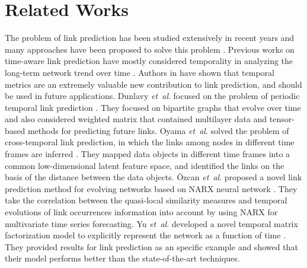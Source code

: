 \section{Related Works}\label{sec:related}
\newcommand{\etal}{\textit{et~al}.}

The problem of link prediction has been studied extensively in recent years and many approaches have been proposed to solve this problem \cite{wang2015link,wang2014review}.
Previous works on time-aware link prediction have mostly considered temporality in analyzing the long-term network trend over time \cite{dhote2013survey}. Authors in \cite{potgieter2009temporality} have shown that temporal metrics are an extremely valuable new contribution to link prediction, and should be used in future applications. 
Dunlavy \etal{} focused on the problem of periodic temporal link prediction \cite{dunlavy2011temporal}. They focused on bipartite graphs that evolve over time and also considered weighted matrix that contained multilayer data and tensor-based methods for predicting future links.
Oyama \etal{} solved the problem of cross-temporal link prediction, in which the links among nodes in different time frames are inferred \cite{oyama2011cross}. They mapped data objects in different time frames into a common low-dimensional latent feature space, and identified the links on the basis of the distance between the data objects.
{\"O}zcan \etal{} proposed a novel link prediction method for evolving networks based on NARX neural network \cite{ozcan2016temporal}. They take the correlation between the quasi-local similarity measures and temporal evolutions of link occurrences information into account by using NARX for multivariate time series forecasting.
Yu \etal{} developed a novel temporal matrix factorization model to explicitly represent the network as a function of time \cite{yu2017temporally}. They provided results for link prediction as an specific example and showed that their model performs better than the state-of-the-art techniques.

